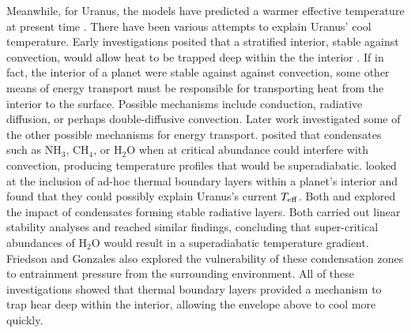 \documentclass[11pt]{ucscthesisbs}
\begin{document}
Meanwhile, for Uranus, the models have predicted a warmer effective temperature at present time \citep{fortney_2011, podolak_1991, hubbard_1995, scheibe_2019}. There have been various attempts to explain Uranus' cool temperature. Early investigations posited that a stratified interior, stable against convection, would allow heat to be trapped deep within the the interior \citep{podolak_1991}. If in fact, the interior of a planet were stable against against convection, some other means of energy transport must be responsible for transporting heat from the interior to the surface. Possible mechanisms include conduction, radiative diffusion, or perhaps double-diffusive convection. Later work investigated some of the other possible mechanisms for energy transport. \citep{guillot_1995} posited that condensates such as NH$_{3}$, CH$_{4}$, or H$_{2}$O when at critical abundance could interfere with convection, producing temperature profiles that would be superadiabatic. \citep{nettelmann_2016} looked at the inclusion of ad-hoc thermal boundary layers within a planet's interior and found that they could possibly explain Uranus's current $T_{\rm eff}$. Both \citep{friedson_2017} and \citep{leconte_2017} explored the impact of condensates forming stable radiative layers. Both carried out linear stability analyses and reached similar findings, concluding that super-critical abundances of H$_{2}$O would result in a superadiabatic temperature gradient. Friedson and Gonzales also explored the vulnerability of these condensation zones to entrainment pressure from the surrounding environment. All of these investigations showed that thermal boundary layers provided a mechanism to trap hear deep within the interior, allowing the envelope above to cool more quickly.
\end{document}
